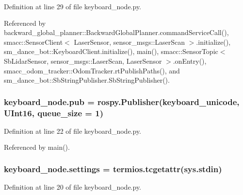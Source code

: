 Definition at line 29 of file keyboard\+\_\+node.\+py.



Referenced by backward\+\_\+global\+\_\+planner\+::\+Backward\+Global\+Planner.\+command\+Service\+Call(), smacc\+::\+Sensor\+Client$<$ Laser\+Sensor, sensor\+\_\+msgs\+::\+Laser\+Scan $>$.\+initialize(), sm\+\_\+dance\+\_\+bot\+::\+Keyboard\+Client.\+initialize(), main(), smacc\+::\+Sensor\+Topic$<$ Sb\+Lidar\+Sensor, sensor\+\_\+msgs\+::\+Laser\+Scan, Laser\+Sensor $>$.\+on\+Entry(), smacc\+\_\+odom\+\_\+tracker\+::\+Odom\+Tracker.\+rt\+Publish\+Paths(), and sm\+\_\+dance\+\_\+bot\+::\+Sb\+String\+Publisher.\+Sb\+String\+Publisher().

\subsubsection[{\texorpdfstring{pub}{pub}}]{\setlength{\rightskip}{0pt plus 5cm}keyboard\+\_\+node.\+pub = rospy.\+Publisher(\textquotesingle{}keyboard\+\_\+unicode\textquotesingle{}, U\+Int16, queue\+\_\+size = 1)}\hypertarget{namespacekeyboard__node_af6db75302d320b64f2d03f7b84404a9f}{}\label{namespacekeyboard__node_af6db75302d320b64f2d03f7b84404a9f}


Definition at line 22 of file keyboard\+\_\+node.\+py.



Referenced by main().

\subsubsection[{\texorpdfstring{settings}{settings}}]{\setlength{\rightskip}{0pt plus 5cm}keyboard\+\_\+node.\+settings = termios.\+tcgetattr(sys.\+stdin)}\hypertarget{namespacekeyboard__node_aaf29d185963f7dbed690d072de1a0b17}{}\label{namespacekeyboard__node_aaf29d185963f7dbed690d072de1a0b17}


Definition at line 20 of file keyboard\+\_\+node.\+py.

